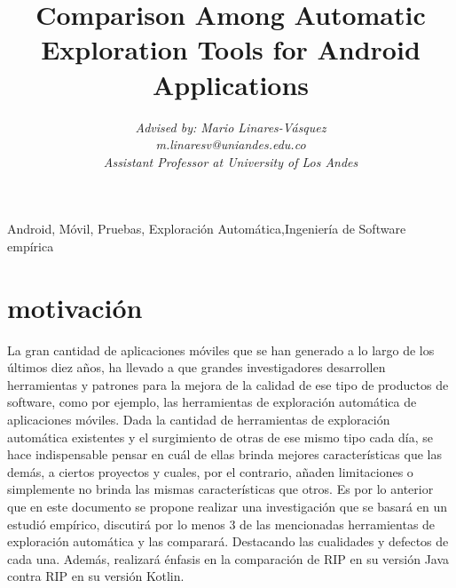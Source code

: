\documentclass[conference]{IEEEtran}
\begin{document}
\title{Comparison Among Automatic Exploration Tools for Android Applications}

\author{
\textit{Advised by: Mario Linares-Vásquez}\\
\textit{m.linaresv@uniandes.edu.co}\\
\textit{Assistant Professor at University of Los Andes}
}

\maketitle

\begin{IEEEkeywords}
Android, Móvil, Pruebas, Exploración Automática,Ingeniería de Software empírica
\end{IEEEkeywords}

\section{motivación}
La gran cantidad de aplicaciones móviles que se han generado a lo largo de los últimos diez años, ha llevado a que grandes investigadores desarrollen herramientas y patrones para la mejora de la calidad de ese tipo de productos de software, como por ejemplo, las herramientas de exploración automática de aplicaciones móviles. Dada la cantidad de herramientas de exploración automática existentes y el surgimiento de otras de ese mismo tipo cada día, se hace indispensable pensar en cuál de ellas brinda mejores características que las demás, a ciertos proyectos y cuales, por el contrario, añaden limitaciones o simplemente no brinda las mismas características que otros. Es por lo anterior que en este documento se propone realizar una investigación que se basará en un estudió empírico, discutirá por lo menos 3 de las mencionadas herramientas de exploración automática y las comparará. Destacando las cualidades y defectos de cada una. Además, realizará énfasis en la comparación de RIP en su versión Java contra RIP en su versión Kotlin.
\end{document}
